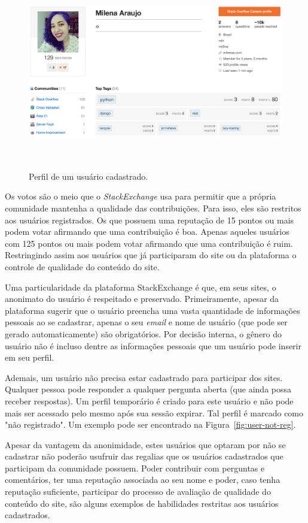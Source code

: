 \begin{figure}[!b]
  \includegraphics[width=1\columnwidth]{figures/user.png}
  \caption[Perfil de um usuário cadastrado]{Perfil de um usuário cadastrado.}~\label{fig:user-reg}
\end{figure}

Os votos são o meio que o \emph{StackExchange} usa para permitir que a própria comunidade mantenha a qualidade das contribuições. Para isso, eles são restritos aos usuários registrados. Os que possuem uma reputação de 15 pontos ou mais podem votar afirmando que uma contribuição é boa. Apenas aqueles usuários com 125 pontos ou mais podem votar afirmando que uma contribuição é ruim. Restringindo assim aos usuários que já participaram do site ou da plataforma o controle de qualidade do conteúdo do site.

Uma particularidade da plataforma StackExchange é que, em seus sites, o anonimato do usuário é respeitado e preservado. Primeiramente, apesar da plataforma sugerir que o usuário preencha uma vasta quantidade de informações pessoais ao se cadastrar, apenas o seu \emph{email} e nome de usuário (que pode ser gerado automaticamente) são obrigatórios. Por decisão interna, o gênero do usuário não é incluso dentre as informações pessoais que um usuário pode inserir em seu perfil.

Ademais, um usuário não precisa estar cadastrado para participar dos sites. Qualquer pessoa pode responder a qualquer pergunta aberta (que ainda possa receber respostas). Um perfil temporário é criado para este usuário e não pode mais ser acessado pelo mesmo após sua sessão expirar. Tal perfil é marcado como "não registrado". Um exemplo pode ser encontrado na Figura~\ref{fig:user-not-reg}.

Apesar da vantagem da anonimidade, estes usuários que optaram por não se cadastrar não poderão usufruir das regalias que os usuários cadastrados que participam da comunidade possuem. Poder contribuir com perguntas e comentários, ter uma reputação associada ao seu nome e poder, caso tenha reputação suficiente, participar do processo de avaliação de qualidade do conteúdo do site, são alguns exemplos de habilidades restritas aos usuários cadastrados.


